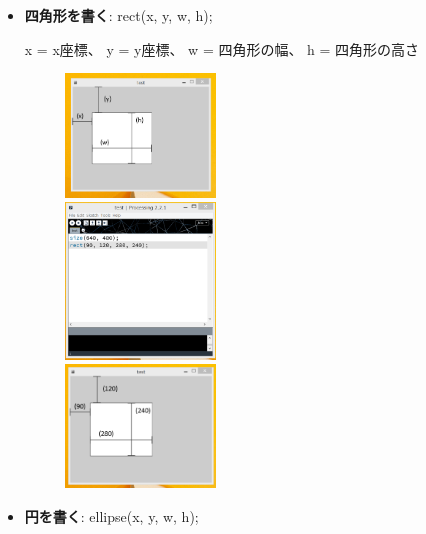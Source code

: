\documentclass[11pt,a4paper]{jarticle}
\begin{document}
\begin{itemize}
 \item \textbf{四角形を書く}: rect(x, y, w, h);

       x = x座標、
       y = y座標、
       w = 四角形の幅、
       h = 四角形の高さ

\begin{figure}[htbp]
 \begin{minipage}{0.325\hsize}
  \begin{center}
   \includegraphics[width=40mm]{Processing_img1-3.eps}
  \end{center}
 \end{minipage}
 \begin{minipage}{0.325\hsize}
 \begin{center}
  \includegraphics[width=40mm]{Processing_img1-1.eps}
 \end{center}
 \end{minipage}
 \begin{minipage}{0.325\hsize}
 \begin{center}
  \includegraphics[width=40mm]{Processing_img1-2.eps}
 \end{center}
 \end{minipage}
\end{figure}

 \item \textbf{円を書く}: ellipse(x, y, w, h);


\end{itemize}
\end{document}
